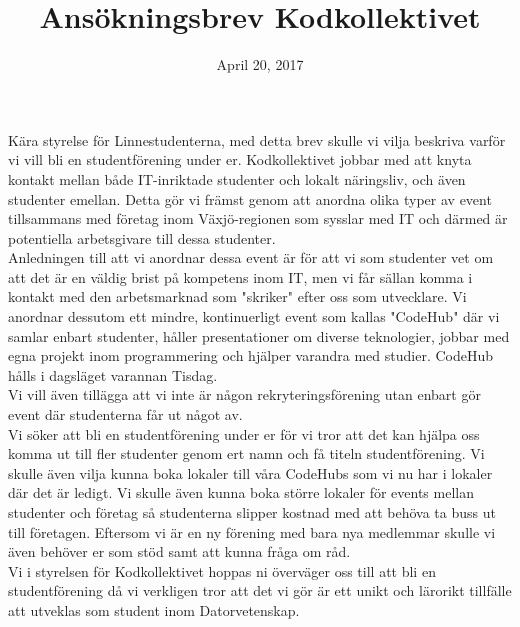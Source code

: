 \documentclass[a4paper,11pt]{article}
\begin{document}
	

\title{Ansökningsbrev Kodkollektivet}
\date{April 20, 2017}
\maketitle

\noindent Kära styrelse för Linnestudenterna, med detta brev skulle vi vilja beskriva varför vi vill bli en studentförening under er. Kodkollektivet jobbar med att knyta kontakt mellan både IT-inriktade studenter och lokalt näringsliv, och även studenter emellan. Detta gör vi främst genom att anordna olika typer av event tillsammans med företag inom Växjö-regionen som sysslar med IT och därmed är potentiella arbetsgivare till dessa studenter. \\

\noindent Anledningen till att vi anordnar dessa event är för att vi som studenter vet om att det är en väldig brist på kompetens inom IT, men vi får sällan komma i kontakt med den arbetsmarknad som "skriker" efter oss som utvecklare. Vi anordnar dessutom ett mindre, kontinuerligt event som kallas "CodeHub" där vi samlar enbart studenter, håller presentationer om diverse teknologier, jobbar med egna projekt inom programmering och hjälper varandra med studier. CodeHub hålls i dagsläget varannan Tisdag.\\

\noindent Vi vill även tillägga att vi inte är någon rekryteringsförening utan enbart gör event där studenterna får ut något av.
\\

\noindent Vi söker att bli en studentförening under er för vi tror att det kan hjälpa oss komma ut till fler studenter genom ert namn och få titeln studentförening. Vi skulle även vilja kunna boka lokaler till våra CodeHubs som vi nu har i lokaler där det är ledigt. Vi skulle även kunna boka större lokaler för events mellan studenter och företag så studenterna slipper kostnad med att behöva ta buss ut till företagen. Eftersom vi är en ny förening med bara nya medlemmar skulle vi även behöver er som stöd samt att kunna fråga om råd.  
\\

\noindent Vi i styrelsen för Kodkollektivet hoppas ni överväger oss till att bli en studentförening då vi verkligen tror att det vi gör är ett unikt och lärorikt tillfälle att utveklas som student inom Datorvetenskap. \\[2cm]

\end{document}
